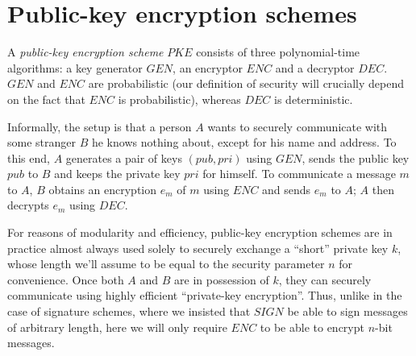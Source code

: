 \section{Public-key encryption schemes}
\label{SEC:PKEPs}
A {\it public-key encryption scheme} $PKE$ consists of three 
polynomial-time algorithms: a key generator $GEN$, an encryptor $ENC$ and a
decryptor $DEC$. $GEN$ and $ENC$ are probabilistic (our definition of security
will crucially depend on the fact that $ENC$ is probabilistic), whereas
$DEC$ is deterministic. 

Informally, the setup is that a person $A$ wants to securely communicate with
some stranger $B$ he knows nothing about, except for his name and address.  To
this end, $A$ generates a pair of keys $(pub,pri)$ using $GEN$, sends the public
key $pub$ to $B$ and keeps the private key $pri$ for himself.  To communicate
a message $m$ to $A$, $B$ obtains an encryption $e_m$ of $m$ using $ENC$ and
sends $e_m$ to $A$; $A$ then decrypts $e_m$ using $DEC$. 
%

For reasons of modularity and efficiency, public-key encryption schemes are in
practice almost always used solely to securely exchange a ``short'' private
key $k$, whose length we'll assume to be equal to the security parameter $n$
for convenience. Once both $A$ and $B$ are in possession of $k$, they can
securely communicate using highly efficient ``private-key encryption''. Thus,
unlike in the case of signature schemes, where we insisted that
$SIGN$ be able to sign messages of arbitrary length, here we will only require
$ENC$ to be able to encrypt $n$-bit messages.  

